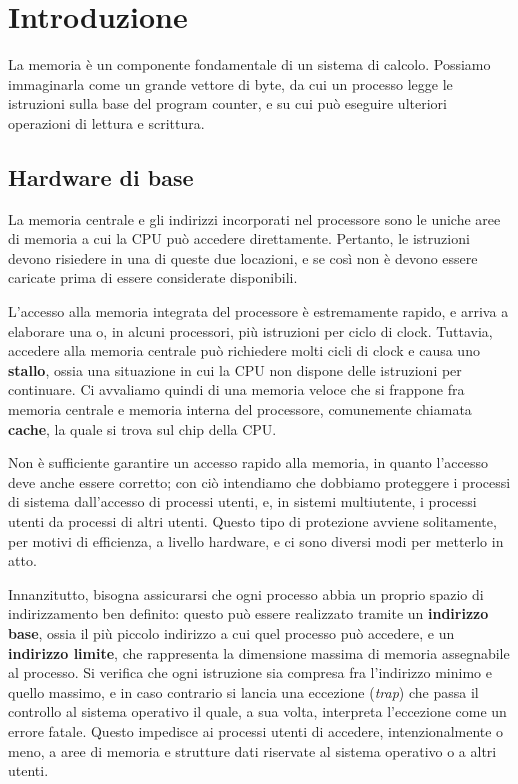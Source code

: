 \section{Introduzione}
    La memoria è un componente fondamentale di un sistema di calcolo. Possiamo immaginarla come un grande vettore di byte, da cui un processo legge le istruzioni sulla base del program counter, e su cui può eseguire ulteriori operazioni di lettura e scrittura.
    
    \subsection{Hardware di base}
        La memoria centrale e gli indirizzi incorporati nel processore sono le uniche aree di memoria a cui la CPU può accedere direttamente. Pertanto, le istruzioni devono risiedere in una di queste due locazioni, e se così non è devono essere caricate prima di essere considerate disponibili.
        
        L'accesso alla memoria integrata del processore è estremamente rapido, e arriva a elaborare una o, in alcuni processori, più istruzioni per ciclo di clock. Tuttavia, accedere alla memoria centrale può richiedere molti cicli di clock e causa uno \textbf{stallo}, ossia una situazione in cui la CPU non dispone delle istruzioni per continuare. Ci avvaliamo quindi di una memoria veloce che si frappone fra memoria centrale e memoria interna del processore, comunemente chiamata \textbf{cache}, la quale si trova sul chip della CPU.
        
        Non è sufficiente garantire un accesso rapido alla memoria, in quanto l'accesso deve anche essere corretto; con ciò intendiamo che dobbiamo proteggere i processi di sistema dall'accesso di processi utenti, e, in sistemi multiutente, i processi utenti da processi di altri utenti. Questo tipo di protezione avviene solitamente, per motivi di efficienza, a livello hardware, e ci sono diversi modi per metterlo in atto.
        
        Innanzitutto, bisogna assicurarsi che ogni processo abbia un proprio spazio di indirizzamento ben definito: questo può essere realizzato tramite un \textbf{indirizzo base}, ossia il più piccolo indirizzo a cui quel processo può accedere, e un \textbf{indirizzo limite}, che rappresenta la dimensione massima di memoria assegnabile al processo. Si verifica che ogni istruzione sia compresa fra l'indirizzo minimo e quello massimo, e in caso contrario si lancia una eccezione (\textit{trap}) che passa il controllo al sistema operativo il quale, a sua volta, interpreta l'eccezione come un errore fatale. Questo impedisce ai processi utenti di accedere, intenzionalmente o meno, a aree di memoria e strutture dati riservate al sistema operativo o a altri utenti.
        
